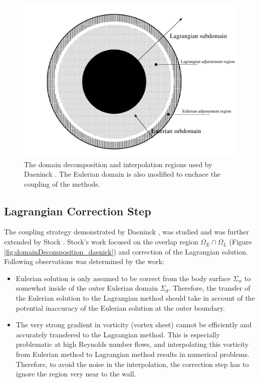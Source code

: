 	\begin{figure}[!t]
		\centering
		\includegraphics[width=0.6\linewidth]{figures/hybrid/daeninckInterpolationRegions.png}
		\caption{The domain decomposition and interpolation regions used by Daeninck \cite{Daeninck2006}. The Eulerian domain is also modified to enchace the coupling of the methods.}
		\label{fig:daeninckInterpolation}
	\end{figure}		
	
	\subsection{Lagrangian Correction Step}
	\label{subsec:hybrid-lcs}
	The coupling strategy demonstrated by Daeninck \cite{Daeninck2006}, was studied and was further extended by Stock \cite{Stock2010a}. Stock's work focused on the overlap region $\Omega_E\cap\Omega_L$ (Figure \ref{fig:domainDecomposition_daenick}) and correction of the Lagrangian solution. Following observations was determined by the work:
	
	\begin{itemize}
	\item Eulerian solution is only assumed to be correct from the body surface $\Sigma_w$ to somewhat inside of the outer Eulerian domain $\Sigma_d$. Therefore, the transfer of the Eulerian solution to the Lagrangian method should take in account of the potential inaccuracy of the Eulerian solution at the outer boundary.
	
	\item The very strong gradient in vorticity (vortex sheet) cannot be efficiently and accurately transfered to the Lagrangian method. This is especially problematic at high Reynolds number flows, and interpolating this vorticity from Eulerian method to Lagrangian method results in numerical problems. Therefore, to avoid the noise in the interpolation, the correction step has to ignore the region very near to the wall.
	\end{itemize}
	
